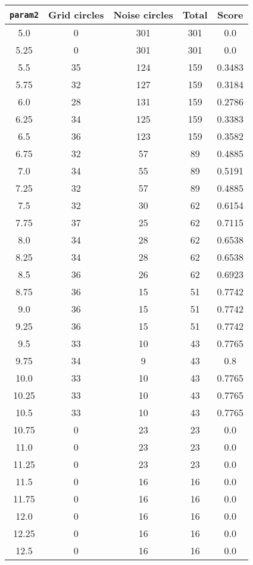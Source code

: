 \documentclass[letterpaper, 12pt]{article}
\begin{document}
\begin{longtable}{|c|c|c|c|c|}
\hline
\textbf{\texttt{param2}} & \textbf{Grid circles} & \textbf{Noise circles} & \textbf{Total} & \textbf{Score} \\
\hline
5.0 & 0 & 301 & 301 & 0.0 \\
\hline
5.25 & 0 & 301 & 301 & 0.0 \\
\hline
5.5 & 35 & 124 & 159 & 0.3483 \\
\hline
5.75 & 32 & 127 & 159 & 0.3184 \\
\hline
6.0 & 28 & 131 & 159 & 0.2786 \\
\hline
6.25 & 34 & 125 & 159 & 0.3383 \\
\hline
6.5 & 36 & 123 & 159 & 0.3582 \\
\hline
6.75 & 32 & 57 & 89 & 0.4885 \\
\hline
7.0 & 34 & 55 & 89 & 0.5191 \\
\hline
7.25 & 32 & 57 & 89 & 0.4885 \\
\hline
7.5 & 32 & 30 & 62 & 0.6154 \\
\hline
7.75 & 37 & 25 & 62 & 0.7115 \\
\hline
8.0 & 34 & 28 & 62 & 0.6538 \\
\hline
8.25 & 34 & 28 & 62 & 0.6538 \\
\hline
8.5 & 36 & 26 & 62 & 0.6923 \\
\hline
8.75 & 36 & 15 & 51 & 0.7742 \\
\hline
9.0 & 36 & 15 & 51 & 0.7742 \\
\hline
9.25 & 36 & 15 & 51 & 0.7742 \\
\hline
9.5 & 33 & 10 & 43 & 0.7765 \\
\hline
9.75 & 34 & 9 & 43 & 0.8 \\
\hline
10.0 & 33 & 10 & 43 & 0.7765 \\
\hline
10.25 & 33 & 10 & 43 & 0.7765 \\
\hline
10.5 & 33 & 10 & 43 & 0.7765 \\
\hline
10.75 & 0 & 23 & 23 & 0.0 \\
\hline
11.0 & 0 & 23 & 23 & 0.0 \\
\hline
11.25 & 0 & 23 & 23 & 0.0 \\
\hline
11.5 & 0 & 16 & 16 & 0.0 \\
\hline
11.75 & 0 & 16 & 16 & 0.0 \\
\hline
12.0 & 0 & 16 & 16 & 0.0 \\
\hline
12.25 & 0 & 16 & 16 & 0.0 \\
\hline
12.5 & 0 & 16 & 16 & 0.0 \\

\end{longtable}
\end{document}
